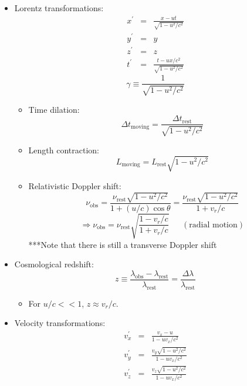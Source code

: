 \documentclass[12pt]{article}
\begin{document}
\begin{itemize}
\item Lorentz transformations:
\begin{eqnarray}
x^\prime &= &\frac{x - ut}{\sqrt{1 - u^2/c^2}} \\
y^\prime &= &y \\
z^\prime &= &z \\
t^\prime &= &\frac{t - ux/c^2}{\sqrt{1 - u^2/c^2}}
\end{eqnarray}
\begin{equation}
\gamma \equiv \frac{1}{\sqrt{1-u^2/c^2}}
\end{equation}
\begin{itemize}
\item Time dilation:
\begin{equation}
\Delta t_\text{moving} = \frac{\Delta t_\text{rest}}{\sqrt{1-u^2/c^2}}
\end{equation}
\item Length contraction:
\begin{equation}
L_\text{moving} = L_\text{rest}\sqrt{1-u^2/c^2}
\end{equation}
\item Relativistic Doppler shift:
\begin{equation}
\nu_\text{obs} = \frac{\nu_\text{rest}\sqrt{1-u^2/c^2}}{1+(u/c)\cos\theta} = \frac{\nu_\text{rest}\sqrt{1-u^2/c^2}}{1+v_r/c}
\end{equation}
\begin{equation}
\Longrightarrow \nu_\text{obs} = \nu_\text{rest}\sqrt{\frac{1 - v_r/c}{1+v_r/c}} ~~~~~~~(\text{radial motion})
\end{equation}
***Note that there is still a transverse Doppler shift
\end{itemize}
\item Cosmological redshift:
\begin{equation}
z\equiv \frac{\lambda_\text{obs} - \lambda_\text{rest}}{\lambda_\text{rest}} = \frac{\Delta \lambda}{\lambda_\text{rest}}
\end{equation}
\begin{itemize}
\item For $u/c << 1$, $z\approx v_r/c$.
\end{itemize}
\item Velocity transformations:
\begin{eqnarray}
v_x^\prime &= &\frac{v_x - u}{1 - uv_x/c^2} \\
v_y^\prime &= &\frac{v_y\sqrt{1 - u^2/c^2}}{1 - uv_x/c^2} \\
v_z^\prime &= &\frac{v_z\sqrt{1 - u^2/c^2}}{1 - uv_x/c^2}

\end{eqnarray}
\end{itemize}
\end{document}
